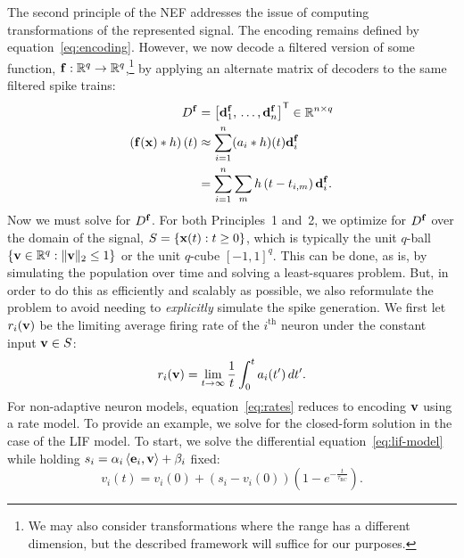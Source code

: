 The second principle of the NEF addresses the issue of computing transformations of the represented signal.
The encoding remains defined by equation~\ref{eq:encoding}.
However, we now decode a filtered version of some function, $\mathbf{f} : \mathbb{R}^q \rightarrow \mathbb{R}^q$,\footnote{
We may also consider transformations where the range has a different dimension, but the described framework will suffice for our purposes.}
by applying an alternate matrix of decoders to the same filtered spike trains:
\begin{equation} \label{eq:trans-decode}
\begin{aligned}
D^{\mathbf{f}} &= {\left[ \mathbf{d}^{\mathbf{f}}_1\text{,}\, \ldots\text{,}\, \mathbf{d}^{\mathbf{f}}_n \right]}^\mathsf{T} \in \mathbb{R}^{n \times q} \\
\left( \mathbf{f}(\mathbf{x}) \ast h \right)(t) &\approx \sum_{i=1}^n (a_i \ast h)(t) \mathbf{d}^{\mathbf{f}}_i \\
&= \sum_{i=1}^n \sum_m h \left(t - t_{i\text{,}m} \right) \mathbf{d}^{\mathbf{f}}_i \text{.}
\end{aligned}
\end{equation}
Now we must solve for $D^{\mathbf{f}}$. For both Principles~1 and~2, we optimize for $D^{\mathbf{f}}$ over the domain of the signal, $S = \{\mathbf{x}(t) : t \ge 0\}$, which is typically the unit $q$-ball $\{ \mathbf{v} \in \mathbb{R}^q : \|\mathbf{v}\|_2 \le 1\}$ or the unit $q$-cube $[-1\text{,}\, 1]^q$.
This can be done, as is, by simulating the population over time and solving a least-squares problem.
But, in order to do this as efficiently and scalably as possible, we also reformulate the problem to avoid needing to \emph{explicitly} simulate the spike generation.
We first let $r_i(\mathbf{v})$ be the limiting average firing rate of the $i^{\text{th}}$ neuron under the constant input $\mathbf{v} \in S$:
\begin{equation} \label{eq:rates}
r_i(\mathbf{v}) = \lim_{t \rightarrow \infty} \frac{1}{t} \int_{0}^t a_i(t') \, dt' \text{.}
\end{equation}
For non-adaptive neuron models, equation~\ref{eq:rates} reduces to encoding $\mathbf{v}$ using a rate model.
To provide an example, we solve for the closed-form solution in the case of the LIF model. To start, we solve the differential equation~\ref{eq:lif-model} while holding $s_i = \alpha_i \left \langle \mathbf{e}_i \text{,}\, \mathbf{v} \right \rangle + \beta_i$ fixed:
\begin{equation*}
v_i(t) = v_i(0) + \left( s_i - v_i(0) \right) \left(1 - e^{-\frac{t}{\tau_\text{RC}}} \right) \text{.}
\end{equation*}

